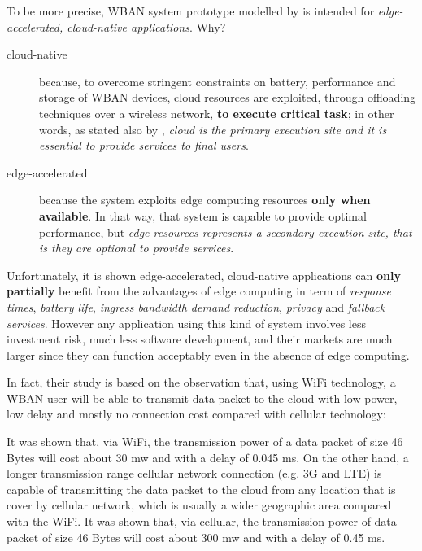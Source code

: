 \documentclass[sigchi]{acmart}
\begin{document}
To be more precise, WBAN system prototype modelled by \citet{MSAReport} is intended for \textit{edge-accelerated, cloud-native applications}. Why?

\begin{description}

\item[cloud-native] because, to overcome stringent constraints on battery, performance and storage of WBAN devices, cloud resources are exploited, through offloading techniques over a wireless network, \textbf{to execute critical task}; in other words, as stated also by \citet{MSAReport}, \textit{cloud is the primary execution site and it is essential to provide services to final users}.

\item[edge-accelerated] because the system exploits edge computing resources \textbf{only when available}. In that way, that system is capable to provide optimal performance, but \textit{edge resources represents a secondary execution site, that is they are optional to provide services}.

\end{description}

Unfortunately, it is shown edge-accelerated, cloud-native applications can \textbf{only partially} benefit from the advantages of edge computing in term of \textit{response times}, \textit{battery life}, \textit{ingress bandwidth demand reduction}, \textit{privacy} and \textit{fallback services}. However any application using this kind of system involves less investment risk, much less software development, and their markets are much larger since they can function acceptably even in the absence of edge computing.





















In fact, their study is based on the observation that, using WiFi technology, a WBAN user will be able to transmit data packet to the cloud with low power, low delay and mostly no connection cost compared with cellular technology:

\vspace{0.3cm}

\begin{quoting}[font=itshape, begintext={``}, endtext={''\cite[par.~3.1]{MSAReport}}]
It was shown that, via WiFi, the transmission power of a data packet of size 46 Bytes will cost about 30 mw and with a delay of 0.045 ms. On the other hand, a longer transmission range cellular network connection (e.g. 3G and LTE) is capable of transmitting the data packet to the cloud from any location that is cover by cellular network, which is usually a wider geographic area compared with the WiFi. It was shown that, via cellular, the transmission power of data packet of size 46 Bytes will cost about 300 mw and with a delay of 0.45 ms.
\end{quoting}
\end{document}
